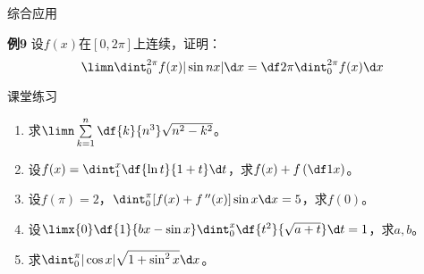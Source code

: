 \begin{frame}{综合应用} 
	\linespread{1.2}
	\begin{exampleblock}{{\bf 例9}\hfill }
		设$f(x)$在$[0,2\pi]$上连续，证明：
		$$\limn\dint_0^{2\pi}f(x)|\sin nx|\d x=\df 2{\pi}\dint_0^{2\pi}f(x)\d x$$
	\end{exampleblock}
\end{frame}


\begin{frame}{课堂练习}
	\linespread{1.2}\pause 
	\begin{enumerate}
	  \item 求$\limn\sum\limits_{k=1}^n\df{k}{n^3}\sqrt{n^2-k^2}$。\pause 
	  \item 设$f(x)=\dint_1^x\df{\ln t}{1+t}\d t$，求$f(x)+f\left(\df
	  1x\right)$。\pause
	  \item 设$f(\pi)=2$，$\dint_0^{\pi}[f(x)+f\,''(x)]\sin x\d x=5$，求$f(0)$。\pause 
	  \item 设$\limx{0}\df{1}{bx-\sin
	  x}\dint_0^x\df{t^2}{\sqrt{a+t}}\d t=1$，求$a,b$。\pause 
	  \item 求$\dint_{0}^{\pi}|\cos x|\sqrt{1+\sin^2x}\d x$。
	\end{enumerate}
\end{frame}

